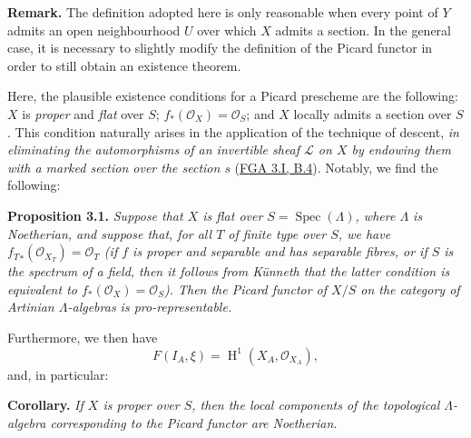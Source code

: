 \documentclass{article}
\newenvironment{itenv}[1]
  {\phantomsection\par\smallskip\noindent\textbf{#1.}\itshape}
  {\par\smallskip}
\newenvironment{rmenv}[1]
  {\phantomsection\par\smallskip\noindent\textbf{#1.}\rmfamily}
  {\par\smallskip}
\theoremstyle{definition}
\theoremstyle{definition}
\theoremstyle{definition}
\theoremstyle{definition}
\theoremstyle{remark}
\begin{document}
\begin{rmenv}{Remark}
The definition adopted here is only reasonable when every point of \(Y\) admits an open neighbourhood \(U\) over which \(X\) admits a section.
In the general case, it is necessary to slightly modify the definition of the Picard functor in order to still obtain an existence theorem.

Here, the plausible existence conditions for a Picard prescheme are the following: \(X\) is \emph{proper} and \emph{flat} over \(S\); \(f_*({\mathscr{O}}_X)={\mathscr{O}}_S\); and \(X\) locally admits a section over \(S\).
This condition naturally arises in the application of the technique of descent, \emph{in eliminating the automorphisms of an invertible sheaf \({\mathscr{L}}\) on \(X\) by endowing them with a marked section over the section \(s\)} (\protect\hyperlink{fga-3-i-section-B.4}{FGA 3.I, B.4}).
Notably, we find the following:

\end{rmenv}

\leavevmode{}%
\begin{itenv}{Proposition 3.1}
Suppose that \(X\) is flat over \(S=\operatorname{Spec}(\Lambda)\), where \(\Lambda\) is Noetherian, and suppose that, for all \(T\) of finite type over \(S\), we have \({f_T}_*({\mathscr{O}}_{X_T})={\mathscr{O}}_T\) (if \(f\) is proper and separable and has separable fibres, or if \(S\) is the spectrum of a field, then it follows from Künneth that the latter condition is equivalent to \(f_*({\mathscr{O}}_X)={\mathscr{O}}_S\)).
Then the Picard functor of \(X/S\) on the category of Artinian \(\Lambda\)-algebras is pro-representable.

Furthermore, we then have
\[
  F(I_A,\xi) = \operatorname{H}^1(X_A,{\mathscr{O}}_{X_A}),
\]
and, in particular:

\end{itenv}

\begin{itenv}{Corollary}
If \(X\) is proper over \(S\), then the local components of the topological \(\Lambda\)-algebra corresponding to the Picard functor are Noetherian.

\end{itenv}
\end{document}
